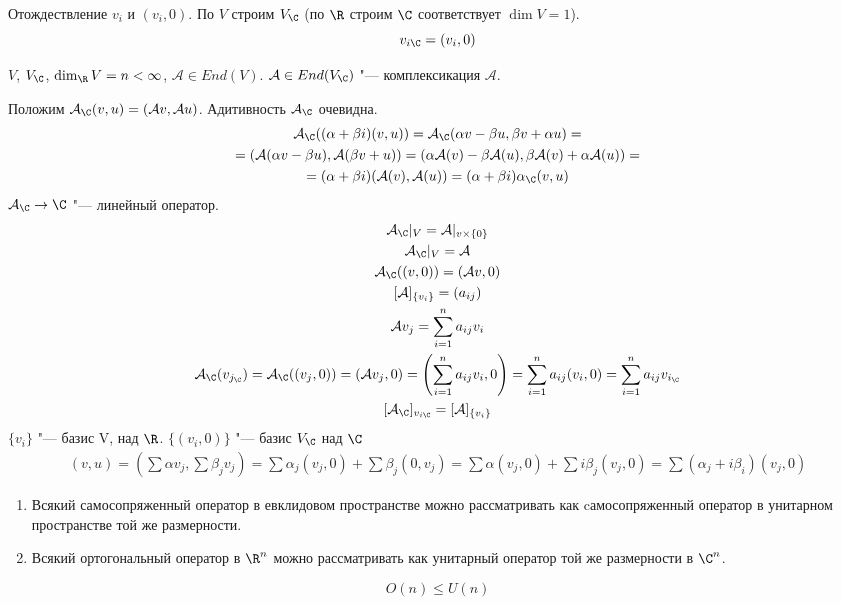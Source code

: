 Отождествление $v_i$ и $(v_i, 0)$.
По $V$ строим $V_{\C}$ (по $\R$ строим $\C$ соответствует $\dim V = 1$).
\[ v_{i\C} = (v_i,0) \]
\begin{Def}
	$V$, $V_{\C}$, $\dim_{\R}V = n < \infty$, $\mathcal A \in End(V)$.
	$\mathcal A \in End(V_{\C})$ "--- комплексикация $\mathcal A$.
\end{Def}
Положим $\mathcal A_{\C} (v, u) = (\mathcal Av, \mathcal Au)$.
Адитивность $\mathcal A_{\C}$ очевидна.
\begin{gather*}
	\mathcal A_{\C}((\alpha + \beta i)(v, u))
	= \mathcal A_{\C}(\alpha v - \beta u, \beta v + \alpha u) = \\
	= (\mathcal A(\alpha v - \beta u), \mathcal A(\beta v + u))
	= (\alpha \mathcal A(v) - \beta \mathcal A(u), \beta \mathcal A(v) + \alpha \mathcal A(u)) = \\
	= (\alpha + \beta i)(\mathcal A(v), \mathcal A(u)) = (\alpha + \beta i)\alpha_{\C}(v, u)
\end{gather*}
$\mathcal A_{\C} \to \C$ "--- линейный оператор.
\begin{gather*}
	\mathcal A_{\C}|_{V} = \mathcal A|_{v \times \{0\}} \\
	\mathcal A_{\C}|_{V} = \mathcal A \\
	\mathcal A_{\C}((v, 0)) = (\mathcal Av, 0) \\
	[\mathcal A]_{\{v_i\}} = (a_{ij}) \\
	\mathcal A v_j = \sum_{i = 1}^n a_{ij}v_i \\
	\mathcal A_{\C}(v_{j_{\C}})
	= \mathcal A_{\C}((v_j, 0))
	= (\mathcal Av_j, 0)
	= \left(\sum_{i = 1}^{n}a_{ij}v_i, 0\right)
	= \sum_{i = 1}^{n}a_{ij}(v_i, 0)
	= \sum_{i = 1}^{n}a_{ij}v_{i_{\C}} \\
	[\mathcal A_{\C}]_{v_{i\C}} = [\mathcal A]_{\{v_i\}}
\end{gather*}
$\{v_i\}$ "--- базис V, над $\R$.
$\{(v_i, 0)\}$ "--- базис $V_{\C}$ над $\C$
\begin{gather*}
	(v, u)
	= \left(\sum \alpha v_j, \sum \beta_{j}v_j\right)
	= \sum \alpha_j(v_j, 0) + \sum \beta_j(0, v_j)
	= \sum \alpha(v_j, 0) + \sum i \beta_j(v_j, 0)
	= \sum(\alpha_j + i \beta_i)(v_j, 0)
\end{gather*}

\begin{exmp}
	\begin{enumerate}
	\item
		Всякий самосопряженный оператор в евклидовом пространстве можно рассматривать как
		cамосопряженный оператор в унитарном пространстве той же размерности.
	\item
		Всякий ортогональный оператор в $\R^n$ можно рассматривать как унитарный оператор той же размерности в $\C^n$.
	\end{enumerate}
\end{exmp}
\begin{conseq}
   \[ O(n) \le U(n) \]
\end{conseq}

